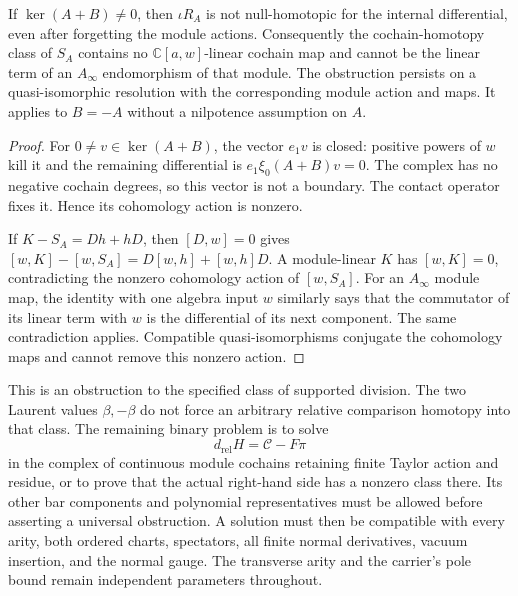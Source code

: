 \begin{theorem}\label{cyquant:thm:contact-obstruction}
If $\ker(A+B)\ne0$, then $\iota R_A$ is not null-homotopic for
the internal differential, even after forgetting the module actions.
Consequently the cochain-homotopy class of $S_A$ contains no
$\mathbb C[a,w]$-linear cochain map and cannot be the linear term
of an $A_\infty$ endomorphism of that module.  The obstruction
persists on a quasi-isomorphic resolution with the corresponding
module action and maps.  It applies to $B=-A$ without a nilpotence
assumption on $A$.
\end{theorem}

\begin{proof}
For $0\ne v\in\ker(A+B)$, the vector $e_1v$ is closed: positive
powers of $w$ kill it and the remaining differential is
$e_1\xi_0(A+B)v=0$.  The complex has no negative cochain degrees,
so this vector is not a boundary.  The contact operator fixes it.
Hence its cohomology action is nonzero.

If $K-S_A=Dh+hD$, then $[D,w]=0$ gives
$[w,K]-[w,S_A]=D[w,h]+[w,h]D$.
A module-linear $K$ has $[w,K]=0$, contradicting the nonzero
cohomology action of $[w,S_A]$.  For an $A_\infty$ module map,
the identity with one algebra input $w$ similarly says that the
commutator of its linear term with $w$ is the differential of its
next component.  The same contradiction applies.  Compatible
quasi-isomorphisms conjugate the cohomology maps and cannot remove
this nonzero action.
\end{proof}

This is an obstruction to the specified class of supported division.
The two Laurent values $\beta,-\beta$ do not force an arbitrary
relative comparison homotopy into that class.  The remaining binary
problem is to solve
\[
 d_{\mathrm{rel}}H=\mathcal C-F\pi
\]
in the complex of continuous module cochains retaining finite Taylor
action and residue, or to prove that the actual right-hand side has a
nonzero class there.  Its other bar components and polynomial
representatives must be allowed before asserting a universal
obstruction.  A solution must then be compatible with every arity,
both ordered charts, spectators, all finite normal derivatives,
vacuum insertion, and the normal gauge.  The transverse arity and
the carrier's pole bound remain independent parameters throughout.

